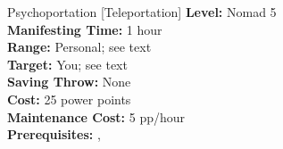{Psychoportation [Teleportation]}
{
	\textbf{Level:}
	Nomad 5\\
	\textbf{Manifesting Time:}
	1 hour\\
	\textbf{Range:}
	Personal; see text\\
	\textbf{Target:}
	You; see text\\
	\textbf{Saving Throw:}
	None\\
	\textbf{Cost:}
	25 power points\\
	\textbf{Maintenance Cost:}
	5 pp/hour\\
	\textbf{Prerequisites:}
	, \\
}
